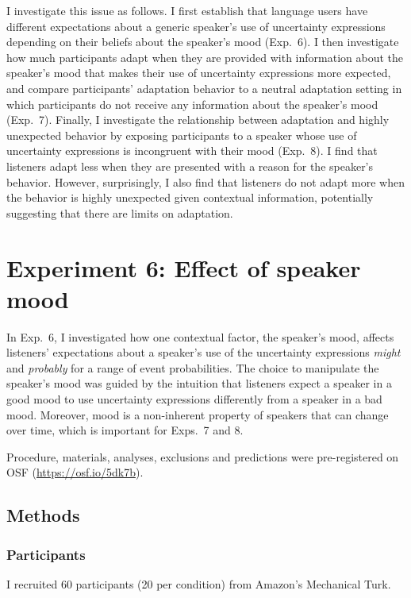 I investigate this issue as follows. I first establish that language users have different expectations about a generic speaker's use of uncertainty expressions depending on their beliefs about the speaker's mood (Exp.~6). I then investigate how much participants adapt when they are provided with information about the speaker's mood that makes their use of uncertainty expressions more expected, and compare participants' adaptation behavior to a neutral adaptation setting in which participants do not receive any information about the speaker's mood (Exp.~7). Finally, I investigate the relationship between adaptation and highly unexpected behavior by exposing participants to a speaker whose use of uncertainty expressions is incongruent with their mood (Exp.~8). I find that listeners adapt less when they are presented with a reason for the speaker's behavior. However, surprisingly, I also find that listeners do not adapt more when the behavior is highly unexpected given contextual information, potentially suggesting that there are limits on adaptation.

\section{Experiment 6: Effect of speaker mood}

In Exp.~6, I investigated how one contextual factor, the speaker's mood, affects listeners' expectations about a speaker's use of the uncertainty expressions \textit{might} and \textit{probably} for a range of event probabilities. The choice to manipulate the speaker's mood was guided by the intuition that listeners expect a speaker in a good mood to use uncertainty expressions differently from a speaker in a bad mood. Moreover, mood is a non-inherent property of speakers that can change over time, which is important for Exps.~7 and 8. 

Procedure, materials, analyses, exclusions and predictions were pre-registered on OSF (\url{https://osf.io/5dk7b}).



\subsection{Methods}

\subsubsection{Participants} I recruited 60 participants (20 per condition) from Amazon's Mechanical Turk. 

